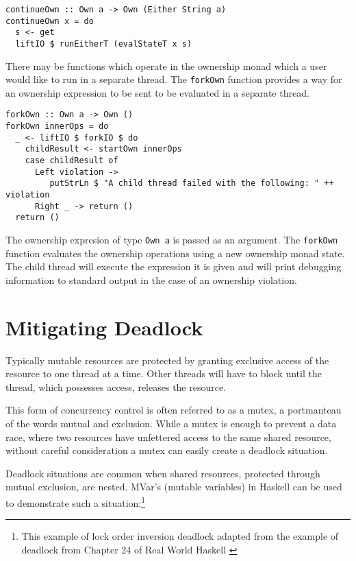 \documentclass[onehalf,11pt]{beavtex}
\begin{document}
\begin{verbatim}
continueOwn :: Own a -> Own (Either String a)
continueOwn x = do
  s <- get
  liftIO $ runEitherT (evalStateT x s)
\end{verbatim}

There may be functions which operate in the ownership monad which a user would
like to run in a separate thread.
The \texttt{forkOwn} function provides a way for an ownership expression to be
sent to be evaluated in a separate thread.

\begin{verbatim}
forkOwn :: Own a -> Own ()
forkOwn innerOps = do
  _ <- liftIO $ forkIO $ do
    childResult <- startOwn innerOps
    case childResult of
      Left violation -> 
         putStrLn $ "A child thread failed with the following: " ++ violation
      Right _ -> return ()
  return ()
\end{verbatim}

The ownership expresion of type \texttt{Own a} is passed as
an argument. The \texttt{forkOwn} function evaluates the ownership operations
using a new ownership monad state. The child thread will execute the
expression it is given and will print debugging information to standard output
in the case of an ownership violation.



\section{Mitigating Deadlock}

Typically mutable resources are protected by granting exclusive access
of the resource to one thread at a time.
Other threads will have to block until the thread, which possesses access,
releases the resource.

This form of concurrency control is often referred to as a mutex, a
portmanteau of the words mutual and exclusion.
While a mutex is enough to prevent a data race, where two resources have
unfettered access to the same shared resource, without careful consideration
a mutex can easily create a deadlock situation.

Deadlock situations are common when shared resources, protected through
mutual exclusion, are nested.  MVar's (mutable variables) in Haskell can be
used to demonstrate such a situation:\footnote{ This example of lock order
  inversion deadlock adapted from the example of deadlock from Chapter 24 of
  Real World Haskell \cite{O'Sullivan:2008:RWH:1523280} }
\end{document}
